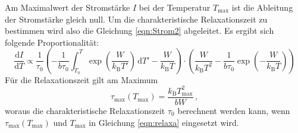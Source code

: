         \noindent Am Maximalwert der Stromstärke $I$ bei der Temperatur $T_\text{max}$ ist die Ableitung der Stromstärke gleich null. Um die charakteristische Relaxationszeit zu bestimmen
        wird also die Gleichung \eqref{eqn:Strom2} abgeleitet. Es ergibt sich folgende Proportionalität:
        \begin{equation}
            \frac{\text{d}I}{\text{d}T} \propto \frac{1}{\tau_0} \left(- \frac{1}{b \tau_0} \int_{T_0}^T \exp\left(\frac{W}{k_\text{B} T'}\right) \, \text{d}T' - \frac{W}{k_\text{B} T}\right) \cdot \left( \frac{W}{k_\text{B}T^2} - \frac{1}{b\tau_0}\exp\left(- \frac{W}{k_\text{B} T}\right)\right)
            \label{eqn:relaxa}
        \end{equation}
        Für die Relaxationszeit gilt am Maximum 
        \begin{equation}
            \tau_{\text{max}} (T_{\text{max}}) = \frac{k_\text{B} T^2_{\text{max}}}{b W}\, ,
        \end{equation}
        woraus die charakteristische Relaxationszeit $\tau_0$ berechnent werden kann, wenn $\tau_{\text{max}} (T_{\text{max}})$ und $T_{\text{max}}$ in Gleichung \eqref{eqn:relaxa} eingesetzt wird.